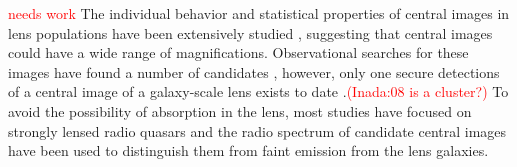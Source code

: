 \documentclass[chicago]{emulateapj}
\newcommand{\red}{\textcolor{red}}
\begin{document}
\red{needs work}
The individual behavior \citep{} and statistical properties of central images in lens populations have been extensively studied \citep[e.g.][]{Wallington:93, Evans:02, Keeton:03},  suggesting that central images could have a wide range of magnifications. 
Observational searches for these images have found a number of candidates \citep[e.g.][]{Inada:05}, however, only one secure detections of a central image of a galaxy-scale lens exists to date \citep{Winn:04}.\red{(Inada:08 is a cluster?)}
To avoid the possibility of absorption in the lens, most studies have focused on strongly lensed radio quasars and the radio spectrum of candidate central images have been used to distinguish them from faint emission from the lens galaxies.


\end{document}
